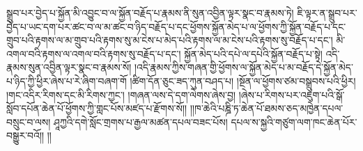 སྒྲུབ་པར་བྱེད་པ་སྐྱོན་མི་འབྱུང་བ་ལ་སྐྱོན་བརྗོད་པ་རྣམས་ནི་སུན་འབྱིན་ལྟར་སྣང་བ་རྣམས་ཏེ། ཇི་ལྟར་ན་སྒྲུབ་པར་བྱེད་པ་ཡང་དག་པར་ཚང་བ་ལ་མ་ཚང་བ་ཉིད་བརྗོད་པ་དང་ཕྱོགས་སྐྱོན་མེད་པ་ལ་ཕྱོགས་ཀྱི་སྐྱོན་བརྗོད་པ་དང་གྲུབ་པའི་རྟགས་ལ་མ་གྲུབ་པའི་རྟགས་སུ་མ་ངེས་པ་མེད་པའི་རྟགས་ལ་མ་ངེས་པའི་རྟགས་སུ་བརྗོད་པ་དང་། མི་འགལ་བའི་རྟགས་ལ་འགལ་བའི་རྟགས་སུ་བརྗོད་པ་དང་། སྐྱོན་མེད་པའི་དཔེ་ལ་དཔེའི་སྐྱོན་བརྗོད་པ་སྟེ། འདི་རྣམས་སུན་འབྱིན་ལྟར་སྣང་བ་རྣམས་སོ། །འདི་རྣམས་ཀྱིས་གཞན་གྱི་ཕྱོགས་ལ་སྐྱོན་མེད་པ་མ་བརྗོད་དེ་སྐྱོན་མེད་པ་ཉིད་ཀྱི་ཕྱིར་ཞེས་པ་རེ་ཞིག་བཞག་གོ །ཚིག་དོན་ཅུང་ཟད་ཀུན་བཤད་པ། །སྔོན་ལ་ཕྱོགས་ཙམ་བསྒྲུབས་པའི་ཕྱིར། །གང་འདིར་རིགས་དང་མི་རིགས་ཀྱང་། །གཞན་ལས་དེ་དག་ལེགས་ཞེས་བྱ། །ཞེས་པ་རིགས་པར་འཇུག་པའི་སྒོ་སློབ་དཔོན་ཆེན་པོ་ཕྱོགས་ཀྱི་གླང་པོས་མཛད་པ་རྫོགས་སོ།། །།ཁ་ཆེའི་པཎྜི་ཏ་ཆེན་པོ་ཐམས་ཅད་མཁྱེན་དཔལ་བསྲུང་བ་ལས། ཤཱཀྱའི་དགེ་སློང་གྲགས་པ་རྒྱལ་མཚན་དཔལ་བཟང་པོས། དཔལ་ས་སྐྱའི་གཙུག་ལག་ཁང་ཆེན་པོར་བསྒྱུར་བའོ།། །།